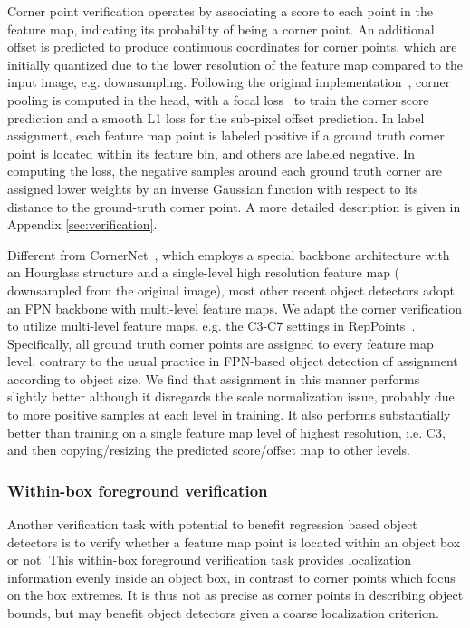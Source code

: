 \documentclass{article}
\begin{document}
Corner point verification operates by associating a score to each point in the feature map, indicating its probability of being a corner point. An additional offset is predicted to produce continuous coordinates for corner points, which are initially quantized due to the lower resolution of the feature map compared to the input image, e.g.  downsampling. Following the original implementation~\cite{CornerNet}, corner pooling is computed in the head, with a focal loss~\cite{RetinaNet} to train the corner score prediction and a smooth L1 loss for the sub-pixel offset prediction. In label assignment, each feature map point is labeled positive if a ground truth corner point is located within its feature bin, and others are labeled negative. In computing the loss, the negative samples around each ground truth corner are assigned lower weights by an inverse Gaussian function with respect to its distance to the ground-truth corner point. A more detailed description is given in Appendix \ref{sec:verification}.

Different from CornerNet~\cite{CornerNet}, which employs a special backbone architecture with an Hourglass structure and a single-level high resolution feature map ( downsampled from the original image), most other recent object detectors adopt an FPN backbone with multi-level feature maps. We adapt the corner verification to utilize multi-level feature maps, e.g. the C3-C7 settings in RepPoints~\cite{yang19reppts}. Specifically, all ground truth corner points are assigned to every feature map level, contrary to the usual practice in FPN-based object detection of assignment according to object size. We find that assignment in this manner performs slightly better although it disregards the scale normalization issue, probably due to more positive samples at each level in training. It also performs substantially better than training on a single feature map level of highest resolution, i.e. C3, and then copying/resizing the predicted score/offset map to other levels.

\subsubsection{Within-box foreground verification}

Another verification task with potential to benefit regression based object detectors is to verify whether a feature map point is located within an object box or not. This within-box foreground verification task provides localization information evenly inside an object box, in contrast to corner points which focus on the box extremes. It is thus not as precise as corner points in describing object bounds, but may benefit object detectors given a coarse localization criterion. 
\end{document}
